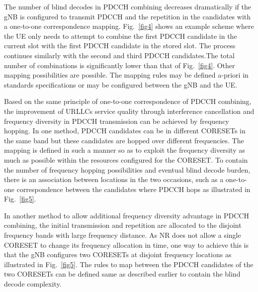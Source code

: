 \documentclass[conference]{IEEEtran}
\begin{document}
The number of blind decodes in PDCCH combining decreases dramatically if the gNB is configured to transmit PDCCH and the repetition in the candidates with a one-to-one correspondence mapping. Fig.~\ref{fig4} shows an example scheme where the UE only needs to attempt to combine the first PDCCH candidate in the current slot with the first PDCCH candidate in the stored slot. The process continues similarly with the second and third PDCCH candidates.The total number of combinations is significantly lower than that of Fig.~\ref{fig4}. Other mapping possibilities are possible. The mapping rules may be defined a-priori in standards specifications or may be configured between the gNB and the UE. 

Based on the same principle of one-to-one correspondence of PDCCH
combining, the improvement of URLLC\textquotesingle s service quality through interference cancellation and frequency diversity in PDCCH transmission can be achieved by frequency hopping. In one
method, PDCCH candidates can be in different CORESETs in the same band but these candidates are hopped over different frequencies. The mapping is defined in such a manner so as to exploit the frequency diversity as much as possible within the resources configured for the CORESET. To contain the number of frequency hopping possibilities and eventual blind decode burden, there is an association between locations in the two occasions, such as a one-to-one correspondence between the candidates where PDCCH hops as illustrated in Fig.~\ref{fig5}.

In another method to allow additional frequency diversity advantage in PDCCH combining, the initial transmission and repetition are allocated to the disjoint frequency bands with large frequency distance. As NR does not allow a single CORESET to change its frequency allocation in time, one way to achieve this is that the gNB configures two CORESETs at disjoint frequency locations as illustrated in Fig.~\ref{fig5}. The rules to map between the PDCCH candidates of the two CORESETs can be defined same as described earlier to contain the blind decode complexity. 
\end{document}
